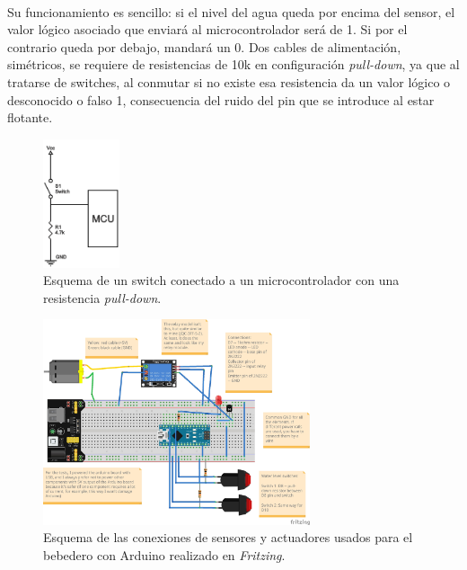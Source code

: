 \documentclass[12pt]{article}
\begin{document}
	  \\
	 
	 \noindent Su funcionamiento es sencillo: si el nivel del agua queda por encima del sensor, el valor lógico asociado que enviará al microcontrolador será de 1. Si por el contrario queda por debajo, mandará un 0. Dos cables de alimentación, simétricos, se requiere de resistencias de 10k en configuración \textit{pull-down}, ya que al tratarse de switches, al conmutar si no existe esa resistencia da un valor lógico o desconocido o falso 1, consecuencia del ruido del pin que se introduce al estar flotante.\\
	
	\begin{figure}[h]
		\begin{center}
			\includegraphics[width=0.2\textwidth]{img/pull-down-resistor.png}
			\caption{Esquema de un switch conectado a un microcontrolador con una resistencia \textit{pull-down}.}
			\label{Esquema resistencia pull-down}
		\end{center}
	\end{figure}
	
	
	\pagebreak
	
	\begin{figure}[h]
		\begin{center}
			\includegraphics[width=0.7\textwidth]{img/bebedero_test_fritzing.jpg}
			\caption{Esquema de las conexiones de sensores y actuadores usados para el bebedero con Arduino realizado en \textit{Fritzing}.}
			\label{Esquema conexiones bebedero Fritzing}
		\end{center}
	\end{figure}
\end{document}
